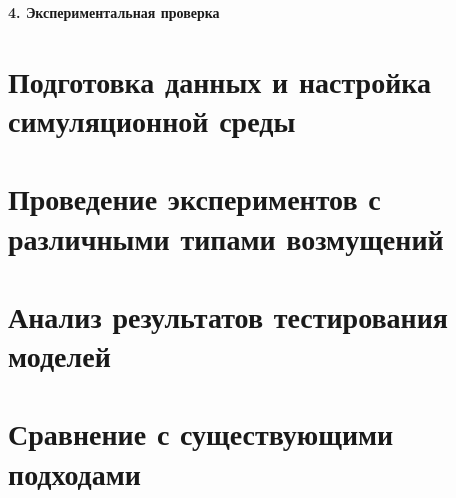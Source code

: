 \newpage
\begin{center}
  \textbf{\large 4. Экспериментальная проверка}
\end{center}

\section{Подготовка данных и настройка симуляционной среды}
\section{Проведение экспериментов с различными типами возмущений}
\section{Анализ результатов тестирования моделей}
\section{Сравнение с существующими подходами}